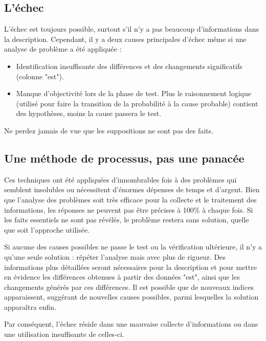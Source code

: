 \subsection{L'échec}

L'échec est toujours possible, surtout s'il n'y a pas beaucoup d'informations dans la description. Cependant, il y a deux causes principales d'échec même si une analyse de problème a été appliquée :
\begin{itemize}
\item 	Identification insuffisante des différences et des changements significatifs (colonne "est").
\item 	Manque d'objectivité lors de la phase de test. Plus le raisonnement logique (utilisé pour faire la transition de la probabilité à la cause probable) contient des hypothèses, moins la cause passera le test. 
\end{itemize}
Ne perdez jamais de vue que les suppositions ne sont pas des faits.

\subsection{Une méthode de processus, pas une panacée}

Ces techniques ont été appliquées d'innombrables fois à des problèmes qui semblent insolubles ou nécessitent d'énormes dépenses de temps et d'argent. Bien que l'analyse des problèmes soit très efficace pour la collecte et le traitement des informations, les réponses ne peuvent pas être précises à 100\% à chaque fois. Si les faits essentiels ne sont pas révélés, le problème restera sans solution, quelle que soit l'approche utilisée.
\vspace{0.3cm}

Si aucune des causes possibles ne passe le test ou la vérification ultérieure, il n'y a qu'une seule solution : répéter l'analyse mais avec plus de rigueur. Des informations plus détaillées seront nécessaires pour la description et pour mettre en évidence les différences obtenues à partir des données "est", ainsi que les changements générés par ces différences. Il est possible que de nouveaux indices apparaissent, suggérant de nouvelles causes possibles, parmi lesquelles la solution apparaîtra enfin.
\vspace{0.3cm}

Par conséquent, l'échec réside dans une mauvaise collecte d'informations ou dans une utilisation insuffisante de celles-ci.
\vspace{0.3cm}

